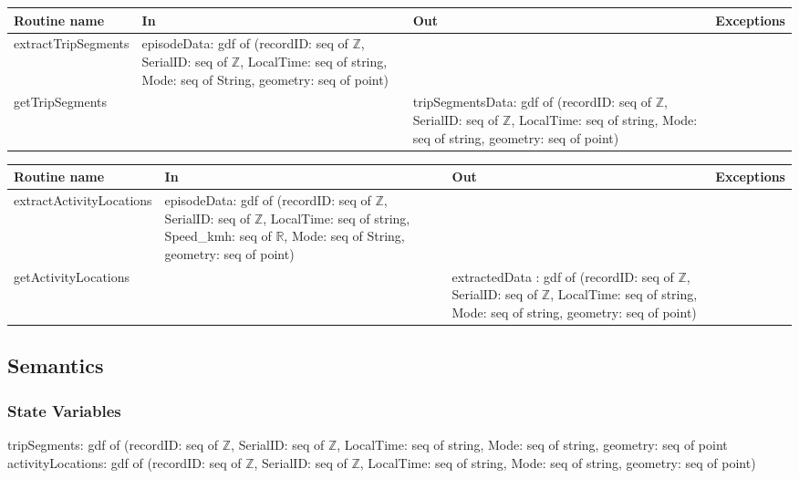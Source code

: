 \documentclass[12pt, titlepage]{article}
\begin{document}
\begin{center}
\begin{tabular}{| l | >{\raggedright}p{4cm} | >{\raggedright}p{4cm} | l |}%
\hline
\textbf{Routine name} & \textbf{In} & \textbf{Out} & \textbf{Exceptions}\\
\hline
extractTripSegments & episodeData: gdf of (recordID: seq of $\mathbb{Z}$, SerialID: seq of $\mathbb{Z}$, LocalTime: seq of string, Mode: seq of String, geometry: seq of point) &  & \\
\hline
getTripSegments &  & tripSegmentsData: gdf of (recordID: seq of $\mathbb{Z}$, SerialID: seq of $\mathbb{Z}$, LocalTime: seq of string, Mode: seq of string, geometry: seq of point) & \\
\hline
\end{tabular}
\end{center}
\begin{center}
\begin{tabular}{| l | >{\raggedright}p{4cm} | >{\raggedright}p{4cm} | l |}%
\hline
\textbf{Routine name} & \textbf{In} & \textbf{Out} & \textbf{Exceptions}\\
\hline
extractActivityLocations & episodeData: gdf of (recordID: seq of $\mathbb{Z}$, SerialID: seq of $\mathbb{Z}$, LocalTime: seq of string, Speed\_kmh: seq of $\mathbb{R}$, Mode: seq of String, geometry: seq of point) & &\\
\hline
getActivityLocations &  & extractedData : gdf of (recordID: seq of $\mathbb{Z}$, SerialID: seq of $\mathbb{Z}$, LocalTime: seq of string, Mode: seq of string, geometry: seq of point) & \\
\hline
\end{tabular}
\end{center}

\subsection{Semantics}

\subsubsection{State Variables}
tripSegments: gdf of (recordID: seq of $\mathbb{Z}$, SerialID: seq of $\mathbb{Z}$, LocalTime: seq of string, Mode: seq of string, geometry: seq of point
\\
activityLocations: gdf of (recordID: seq of $\mathbb{Z}$, SerialID: seq of $\mathbb{Z}$, LocalTime: seq of string, Mode: seq of string, geometry: seq of point)
\end{document}
